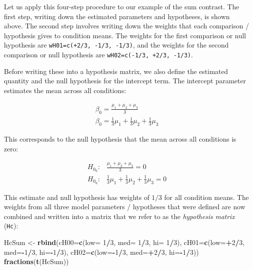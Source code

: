 \documentclass[12pt,]{krantz}
\newenvironment{Shaded}{\begin{snugshade}}{\end{snugshade}}
\newcommand{\KeywordTok}[1]{\textcolor[rgb]{0.13,0.29,0.53}{\textbf{#1}}}
\newcommand{\DataTypeTok}[1]{\textcolor[rgb]{0.13,0.29,0.53}{#1}}
\newcommand{\DecValTok}[1]{\textcolor[rgb]{0.00,0.00,0.81}{#1}}
\newcommand{\StringTok}[1]{\textcolor[rgb]{0.31,0.60,0.02}{#1}}
\newcommand{\OperatorTok}[1]{\textcolor[rgb]{0.81,0.36,0.00}{\textbf{#1}}}
\newcommand{\NormalTok}[1]{#1}
\theoremstyle{definition}
\theoremstyle{definition}
\theoremstyle{definition}
\theoremstyle{remark}
\begin{document}
Let us apply this four-step procedure to our example of the sum
contrast. The first step, writing down the estimated parameters and
hypotheses, is shown above. The second step involves writing down the
weights that each comparison / hypothesis gives to condition means. The
weights for the first comparison or null hypothesis are
\texttt{wH01=c(+2/3,\ -1/3,\ -1/3)}, and the weights for the second
comparison or null hypothesis are \texttt{wH02=c(-1/3,\ +2/3,\ -1/3)}.

Before writing these into a hypothesis matrix, we also define the
estimated quantity and the null hypothesis for the intercept term. The
intercept parameter estimates the mean across all conditions:

\begin{align}
\beta_0 = \frac{\mu_1 + \mu_2 + \mu_3}{3} \\
\beta_0 = \frac{1}{3} \mu_1 + \frac{1}{3}\mu_2 + \frac{1}{3}\mu_3
\end{align}

This corresponds to the null hypothesis that the mean across all
conditions is zero:

\begin{align}
H_{0_0}: &\frac{\mu_1 + \mu_2 + \mu_3}{3} = 0 \\
H_{0_0}: &\frac{1}{3} \mu_1 + \frac{1}{3}\mu_2 + \frac{1}{3}\mu_3 = 0
\end{align}

This estimate and null hypothesis has weights of \(1/3\) for all
condition means. The weights from all three model parameters /
hypotheses that were defined are now combined and written into a matrix
that we refer to as the \emph{hypothesis matrix} (\texttt{Hc}):

\begin{Shaded}
\begin{Highlighting}[]
\NormalTok{HcSum <-}\StringTok{ }\KeywordTok{rbind}\NormalTok{(}\DataTypeTok{cH00=}\KeywordTok{c}\NormalTok{(}\DataTypeTok{low=} \DecValTok{1}\OperatorTok{/}\DecValTok{3}\NormalTok{, }\DataTypeTok{med=} \DecValTok{1}\OperatorTok{/}\DecValTok{3}\NormalTok{, }\DataTypeTok{hi=} \DecValTok{1}\OperatorTok{/}\DecValTok{3}\NormalTok{), }
               \DataTypeTok{cH01=}\KeywordTok{c}\NormalTok{(}\DataTypeTok{low=}\OperatorTok{+}\DecValTok{2}\OperatorTok{/}\DecValTok{3}\NormalTok{, }\DataTypeTok{med=}\OperatorTok{-}\DecValTok{1}\OperatorTok{/}\DecValTok{3}\NormalTok{, }\DataTypeTok{hi=}\OperatorTok{-}\DecValTok{1}\OperatorTok{/}\DecValTok{3}\NormalTok{), }
               \DataTypeTok{cH02=}\KeywordTok{c}\NormalTok{(}\DataTypeTok{low=}\OperatorTok{-}\DecValTok{1}\OperatorTok{/}\DecValTok{3}\NormalTok{, }\DataTypeTok{med=}\OperatorTok{+}\DecValTok{2}\OperatorTok{/}\DecValTok{3}\NormalTok{, }\DataTypeTok{hi=}\OperatorTok{-}\DecValTok{1}\OperatorTok{/}\DecValTok{3}\NormalTok{))}
\KeywordTok{fractions}\NormalTok{(}\KeywordTok{t}\NormalTok{(HcSum))}
\end{Highlighting}
\end{Shaded}
\end{document}
